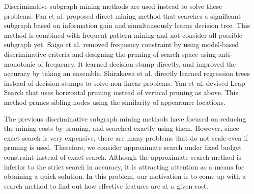 Discriminative subgraph mining methods are used instead to solve these problems.
Fan et al. \cite{Fan:2008} proposed direct mining method 
that searches a significant subgraph based on information gain and simultaneously learns decision tree.
This method is combined with frequent pattern mining and not consider all possible subgraph yet.
Saigo et al. \cite{Saigo:2009} removed frequency constraint 
by using model-based discriminative criteria 
and designing the pruning of search space using anti-monotonic of frequency.
It learned decision stump directly,  
and improved the accuracy by taking an ensemble.
Shirakawa et al. \cite{Shirakawa:2018} directly learned regression trees instead of decision stumps
to solve non-linear problems.
Yan et al. devised Leap Search \cite{Yan:2008} that uses horizontal pruning 
instead of vertical pruning as above.
This method prunes sibling nodes using the similarity of appearance locations.

The previous discriminative subgraph mining methods have focused on reducing the mining costs by pruning, 
and searched exactly using them. 
However, since exact search is very expensive, 
there are many problems that do not scale even if pruning is used.
Therefore, we consider approximate search under fixed budget constraint instead of exact search.
Although the approximate search method is inferior to the strict search in accuracy, 
it is attracting attention as a means for obtaining a quick solution.
In this problem, our motivation is to come up with a search method 
to find out how effective features are at a given cost.


\begin{comment}
The previous discriminative subgraph mining methods have focused on reducing the mining costs by pruning, 
but all of the search policies have used naive depth-first search.
One of our motivations is that smarter search policies can make mining more efficient.
In the previous methods, 
discriminative criteria and its upper or lower bounds are calculated for every subgraph,
so designing search policy based on these may be a good solution.
Another motivation is that there is no need for an exact search.
Some of the previous methods learn ensemble models, 
and in the ensemble models it is not necessary to each weak learner be so strong.
Conversely, an exact search may not only increase search costs, but also lead to over-fitting.
Therefore, in present paper, 
consider a search that can obtain a better approximate solution under fixed budget constraint.
\end{comment}

